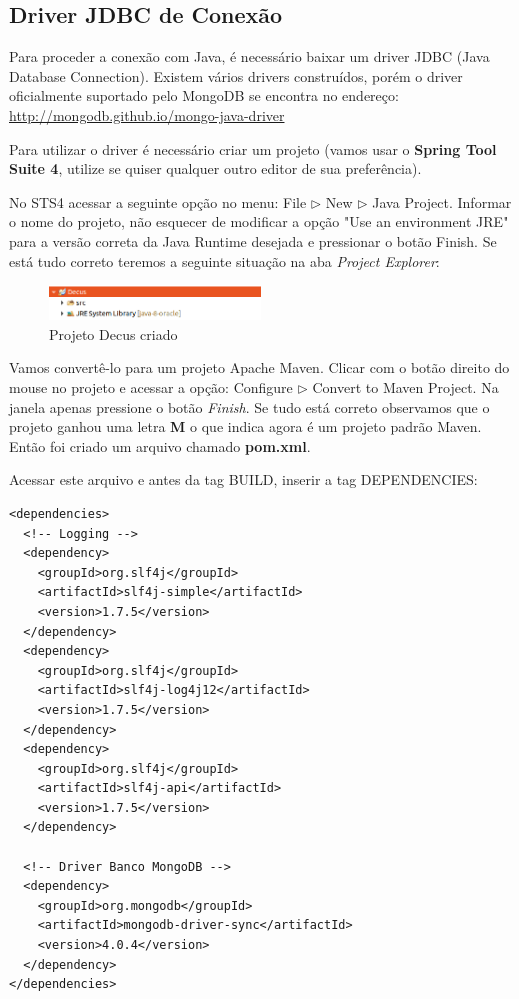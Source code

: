 \documentclass[a4paper,11pt]{article}
\begin{document}
\subsection{Driver JDBC de Conexão}
Para proceder a conexão com Java, é necessário baixar um driver JDBC (Java Database Connection). Existem vários drivers construídos, porém o driver oficialmente suportado pelo MongoDB se encontra no endereço: \url{http://mongodb.github.io/mongo-java-driver}

Para utilizar o driver é necessário criar um projeto (vamos usar o \textbf{Spring Tool Suite 4}, utilize se quiser qualquer outro editor de sua preferência).

No STS4 acessar a seguinte opção no menu: File $\triangleright$ New $\triangleright$ Java Project. Informar o nome do projeto, não esquecer de modificar a opção "Use an environment JRE" para a versão correta da Java Runtime desejada e pressionar o botão Finish. Se está tudo correto teremos a seguinte situação na aba \textit{Project Explorer}:
\begin{figure}[H]
	\centering
	\includegraphics[width=0.5\textwidth]{imagens/projetoCriado.png}
	\caption{Projeto Decus criado}
\end{figure}

Vamos convertê-lo para um projeto Apache Maven. Clicar com o botão direito do mouse no projeto e acessar a opção: Configure $\triangleright$ Convert to Maven Project. Na janela apenas pressione o botão \textit{Finish}. Se tudo está correto observamos que o projeto ganhou uma letra \textbf{M} o que indica agora é um projeto padrão Maven. Então foi criado um arquivo chamado \textbf{pom.xml}. 

Acessar este arquivo e antes da tag BUILD, inserir a tag DEPENDENCIES:
\begin{lstlisting}
<dependencies>
  <!-- Logging -->
  <dependency>
    <groupId>org.slf4j</groupId>
    <artifactId>slf4j-simple</artifactId>
    <version>1.7.5</version>
  </dependency>
  <dependency>
    <groupId>org.slf4j</groupId>
    <artifactId>slf4j-log4j12</artifactId>
    <version>1.7.5</version>
  </dependency>
  <dependency>
    <groupId>org.slf4j</groupId>
    <artifactId>slf4j-api</artifactId>
    <version>1.7.5</version>
  </dependency>

  <!-- Driver Banco MongoDB -->
  <dependency>
    <groupId>org.mongodb</groupId>
    <artifactId>mongodb-driver-sync</artifactId>
    <version>4.0.4</version>
  </dependency>
</dependencies>
\end{lstlisting}
\end{document}

